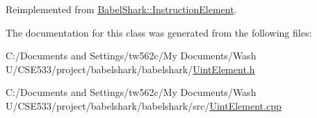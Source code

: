 Reimplemented from \hyperlink{class_babel_shark_1_1_instruction_element_7795ad0b2acedb5a2b68d2c3e63351ae}{BabelShark::InstructionElement}.

The documentation for this class was generated from the following files:\begin{CompactItemize}
\item 
C:/Documents and Settings/tw562c/My Documents/Wash U/CSE533/project/babelshark/babelshark/\hyperlink{_uint_element_8h}{UintElement.h}\item 
C:/Documents and Settings/tw562c/My Documents/Wash U/CSE533/project/babelshark/babelshark/src/\hyperlink{_uint_element_8cpp}{UintElement.cpp}\end{CompactItemize}
